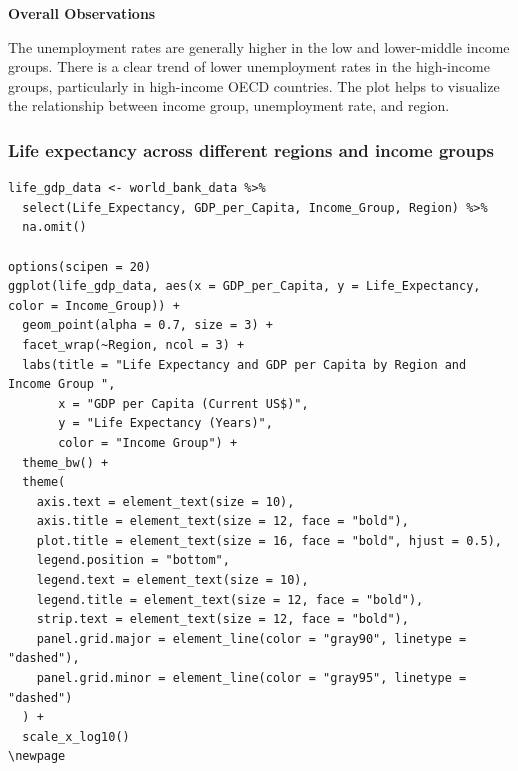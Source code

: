 \documentclass{article}\usepackage[]{graphicx}\usepackage[]{xcolor}
\begin{document}
\textbf{Overall Observations}

The unemployment rates are generally higher in the low and lower-middle income groups. There is a clear trend of lower unemployment rates in the high-income groups, particularly in high-income OECD countries. The plot helps to visualize the relationship between income group, unemployment rate, and region.

\subsubsection{Life expectancy across different regions and income groups}
\begin{lstlisting}
life_gdp_data <- world_bank_data %>%
  select(Life_Expectancy, GDP_per_Capita, Income_Group, Region) %>%
  na.omit()

options(scipen = 20)
ggplot(life_gdp_data, aes(x = GDP_per_Capita, y = Life_Expectancy, color = Income_Group)) +
  geom_point(alpha = 0.7, size = 3) + 
  facet_wrap(~Region, ncol = 3) +  
  labs(title = "Life Expectancy and GDP per Capita by Region and Income Group ",
       x = "GDP per Capita (Current US$)",
       y = "Life Expectancy (Years)",
       color = "Income Group") +
  theme_bw() +  
  theme(
    axis.text = element_text(size = 10),
    axis.title = element_text(size = 12, face = "bold"),
    plot.title = element_text(size = 16, face = "bold", hjust = 0.5),
    legend.position = "bottom", 
    legend.text = element_text(size = 10),
    legend.title = element_text(size = 12, face = "bold"),
    strip.text = element_text(size = 12, face = "bold"),
    panel.grid.major = element_line(color = "gray90", linetype = "dashed"),
    panel.grid.minor = element_line(color = "gray95", linetype = "dashed")
  ) +
  scale_x_log10()  
\newpage

\end{lstlisting}
\end{document}
